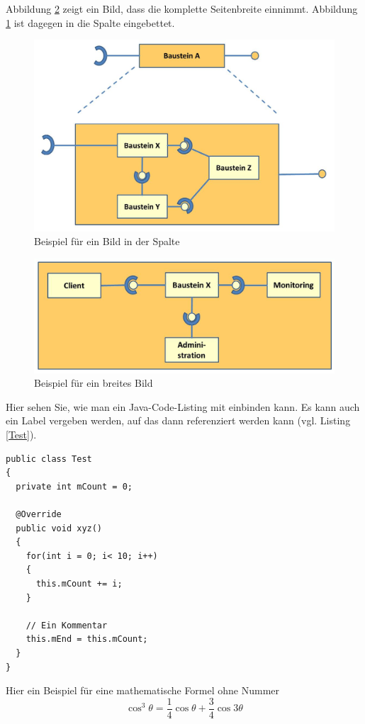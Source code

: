 \documentclass[fleqn,10pt,ngerman]{SelfArx}
\begin{document}
Abbildung \ref{fig:MultiInterfaces} zeigt ein Bild, dass die komplette Seitenbreite einnimmt. Abbildung \ref{fig:Baustein} ist dagegen in die Spalte eingebettet.


\begin{figure}[ht]\centering
	\includegraphics[width=5 cm]{Abbildungen/Baustein}
	\caption{Beispiel für ein Bild in der Spalte}
	\label{fig:Baustein}
\end{figure}

\begin{figure}[ht]\centering %
	\includegraphics[width=\linewidth]{Abbildungen/BausteinMultiInterfaces}
	\caption{Beispiel für ein breites Bild}
	\label{fig:MultiInterfaces}
\end{figure}

Hier sehen Sie, wie man ein Java-Code-Listing mit einbinden kann. Es kann auch ein Label vergeben werden, auf das dann referenziert werden kann (vgl. Listing \ref{Test}). 
\begin{lstlisting}[caption=Eine Testklasse, label=Test]
public class Test
{
  private int mCount = 0;
	
  @Override	
  public void xyz()
  {
    for(int i = 0; i< 10; i++)
    {
      this.mCount += i;
    }
	
    // Ein Kommentar		
    this.mEnd = this.mCount;
  }
}
\end{lstlisting}


Hier ein Beispiel für eine mathematische Formel ohne Nummer
\begin{equation*}
	\cos^3 \theta =\frac{1}{4}\cos\theta+\frac{3}{4}\cos 3\theta
	\label{eq:refname2}
\end{equation*}
\end{document}

